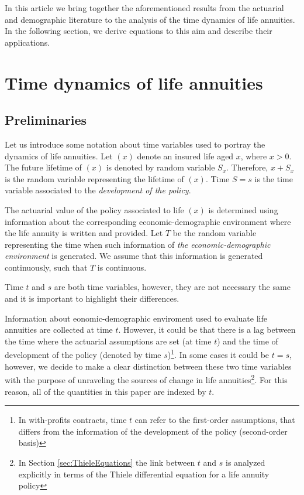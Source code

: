 \documentclass[12pt]{article}
\begin{document}
In this article we bring together the aforementioned results from the actuarial and demographic literature to the analysis of the time dynamics of life annuities. In the following section, we derive equations to this aim and describe their applications.

\section{Time dynamics of life annuities}\label{sec:3_timedynamics}
\subsection{Preliminaries}\label{preliminaries}

Let us introduce some notation about time variables used to portray the dynamics of life annuities. Let $(x)$ denote an insured life aged $x$, where $x>0$. The future lifetime of $(x)$ is denoted by random variable $S_x$. Therefore, $x+S_x$ is the random variable representing the lifetime of $(x)$. Time $S=s$ is the time variable associated to the \textit{development of the policy}.

The actuarial value of the policy associated to life $(x)$ is determined using information about the corresponding economic-demographic environment where the life annuity is written and provided. Let $T$ be the random variable representing the time when such information of \textit{the economic-demographic environment} is generated. We assume that this information is generated continuously, such that $T$ is continuous.

Time $t$ and $s$ are both time variables, however, they are not necessary the same and it is important to highlight their differences.

Information about eonomic-demographic enviroment used to evaluate life annuities are collected at time $t$. However, it could be that there is a lag between the time where the actuarial assumptions are set (at time $t$) and the time of development of the policy (denoted by time $s$)\footnote{In with-profits contracts, time $t$ can refer to the first-order assumptions, that differs from the information of the development of the policy (second-order basis)}. In some cases it could be $t=s$, however, we decide to make a clear distinction between these two time variables with the purpose of unraveling the sources of change in life annuities\footnote{In Section \ref{sec:ThieleEquations} the link between $t$ and $s$ is analyzed explicitly in terms of the Thiele differential equation for a life annuity policy}. For this reason, all of the quantities in this paper are indexed by $t$. 
\end{document}
